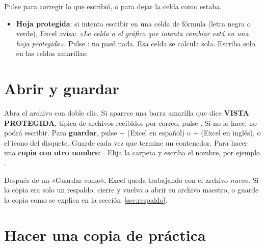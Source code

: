 \begin{center}
\end{center}
Pulse  para corregir lo que escribió, o  para dejar la celda como estaba.

\begin{itemize}
  \item \textbf{Hoja protegida}: si intenta escribir en una celda de fórmula (letra negra o verde), Excel avisa:
  \emph{«La celda o el gráfico que intenta cambiar está en una hoja protegida»}. Pulse : no pasó nada.
  Esa celda se calcula sola. Escriba solo en las celdas amarillas.
\end{itemize}

\section{Abrir y guardar}

\begin{pasos}
\paso Abra el archivo con doble clic.
\paso Si aparece una barra amarilla que dice \textbf{VISTA PROTEGIDA}, típica de archivos recibidos por correo, pulse
      . Si no lo hace, no podrá escribir.
\paso Para \textbf{guardar}, pulse + (Excel en español) o + (Excel en inglés), o el icono
      del disquete. Guarde cada vez que termine un contenedor.
\paso Para hacer una \textbf{copia con otro nombre}: . Elija la carpeta y escriba el nombre,
      por ejemplo .
\end{pasos}

\begin{atencion}
Después de un «Guardar como», Excel queda trabajando con el archivo \emph{nuevo}. Si la copia era solo un respaldo, cierre y vuelva a
abrir su archivo maestro, o guarde la copia como se explica en la sección~\ref{sec:respaldo}.
\end{atencion}

\section{Hacer una copia de práctica}\label{sec:practica}

